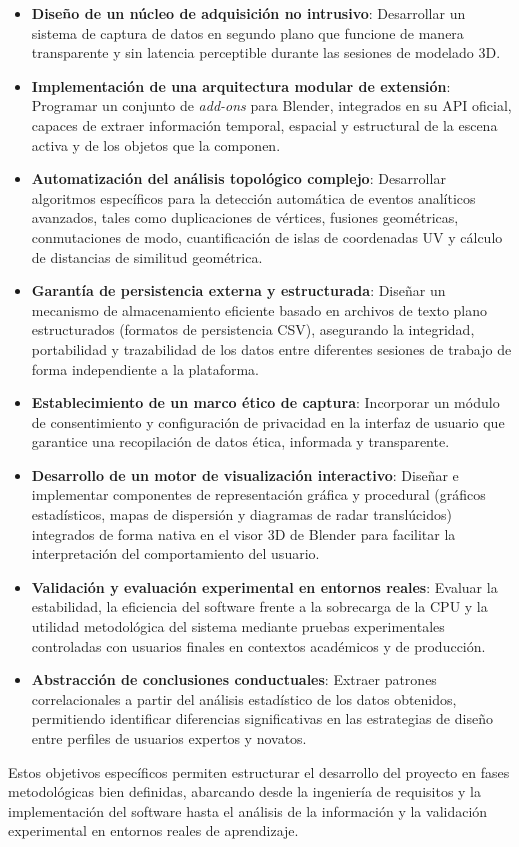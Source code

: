 \begin{itemize}

\item \textbf{Diseño de un núcleo de adquisición no intrusivo}: Desarrollar un sistema de captura de datos en segundo plano que funcione de manera transparente y sin latencia perceptible durante las sesiones de modelado 3D.

\item \textbf{Implementación de una arquitectura modular de extensión}: Programar un conjunto de \textit{add-ons} para Blender, integrados en su API oficial, capaces de extraer información temporal, espacial y estructural de la escena activa y de los objetos que la componen.

\item \textbf{Automatización del análisis topológico complejo}: Desarrollar algoritmos específicos para la detección automática de eventos analíticos avanzados, tales como duplicaciones de vértices, fusiones geométricas, conmutaciones de modo, cuantificación de islas de coordenadas UV y cálculo de distancias de similitud geométrica.

\item \textbf{Garantía de persistencia externa y estructurada}: Diseñar un mecanismo de almacenamiento eficiente basado en archivos de texto plano estructurados (formatos de persistencia CSV), asegurando la integridad, portabilidad y trazabilidad de los datos entre diferentes sesiones de trabajo de forma independiente a la plataforma.

\item \textbf{Establecimiento de un marco ético de captura}: Incorporar un módulo de consentimiento y configuración de privacidad en la interfaz de usuario que garantice una recopilación de datos ética, informada y transparente.

\item \textbf{Desarrollo de un motor de visualización interactivo}: Diseñar e implementar componentes de representación gráfica y procedural (gráficos estadísticos, mapas de dispersión y diagramas de radar translúcidos) integrados de forma nativa en el visor 3D de Blender para facilitar la interpretación del comportamiento del usuario.

\item \textbf{Validación y evaluación experimental en entornos reales}: Evaluar la estabilidad, la eficiencia del software frente a la sobrecarga de la CPU y la utilidad metodológica del sistema mediante pruebas experimentales controladas con usuarios finales en contextos académicos y de producción.

\item \textbf{Abstracción de conclusiones conductuales}: Extraer patrones correlacionales a partir del análisis estadístico de los datos obtenidos, permitiendo identificar diferencias significativas en las estrategias de diseño entre perfiles de usuarios expertos y novatos.

\end{itemize}

Estos objetivos específicos permiten estructurar el desarrollo del proyecto en fases metodológicas bien definidas, abarcando desde la ingeniería de requisitos y la implementación del software hasta el análisis de la información y la validación experimental en entornos reales de aprendizaje.